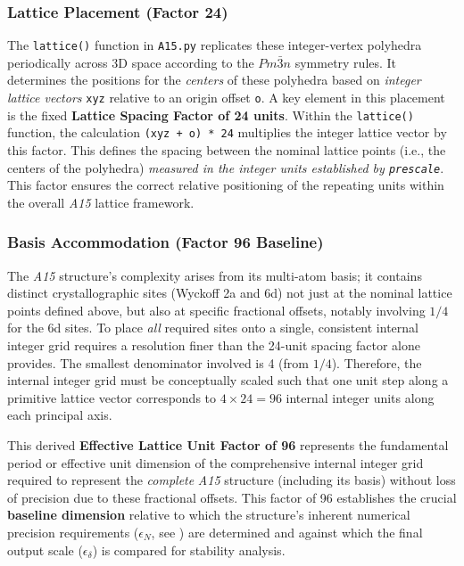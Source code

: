 \documentclass[10pt]{article}
\def\AAAB{\textit{A15}}
\begin{document}
\subsubsection{Lattice Placement (Factor 24)}\label{subsubsec:scaling-lattice}
The \texttt{lattice()} function in \texttt{A15.py} replicates these integer-vertex polyhedra periodically across 3D space according to the $Pm\bar{3}n$ symmetry rules. It determines the positions for the \emph{centers} of these polyhedra based on \emph{integer lattice vectors} \texttt{xyz} relative to an origin offset \texttt{o}. A key element in this placement is the fixed \textbf{Lattice Spacing Factor of 24 units}. Within the \texttt{lattice()} function, the calculation \texttt{(xyz + o) * 24} multiplies the integer lattice vector by this factor. This defines the spacing between the nominal lattice points (i.e., the centers of the polyhedra) \emph{measured in the integer units established by \texttt{prescale}}. This factor ensures the correct relative positioning of the repeating units within the overall \AAAB{} lattice framework.

\subsubsection{Basis Accommodation (Factor 96 Baseline)}\label{subsubsec:scaling-baseline}
The \AAAB{} structure's complexity arises from its multi-atom basis; it contains distinct crystallographic sites (Wyckoff 2a and 6d) not just at the nominal lattice points defined above, but also at specific fractional offsets, notably involving $1/4$ for the 6d sites. To place \emph{all} required sites onto a single, consistent internal integer grid requires a resolution finer than the 24-unit spacing factor alone provides. The smallest denominator involved is 4 (from $1/4$). Therefore, the internal integer grid must be conceptually scaled such that one unit step along a primitive lattice vector corresponds to $4 \times 24 = 96$ internal integer units along each principal axis.

This derived \textbf{Effective Lattice Unit Factor of 96} represents the fundamental period or effective unit dimension of the comprehensive internal integer grid required to represent the \emph{complete} \AAAB{} structure (including its basis) without loss of precision due to these fractional offsets. This factor of 96 establishes the crucial \textbf{baseline dimension} relative to which the structure's inherent numerical precision requirements ($\epsilon_N$, see ) are determined and against which the final output scale ($\epsilon_\delta$) is compared for stability analysis.
\end{document}
